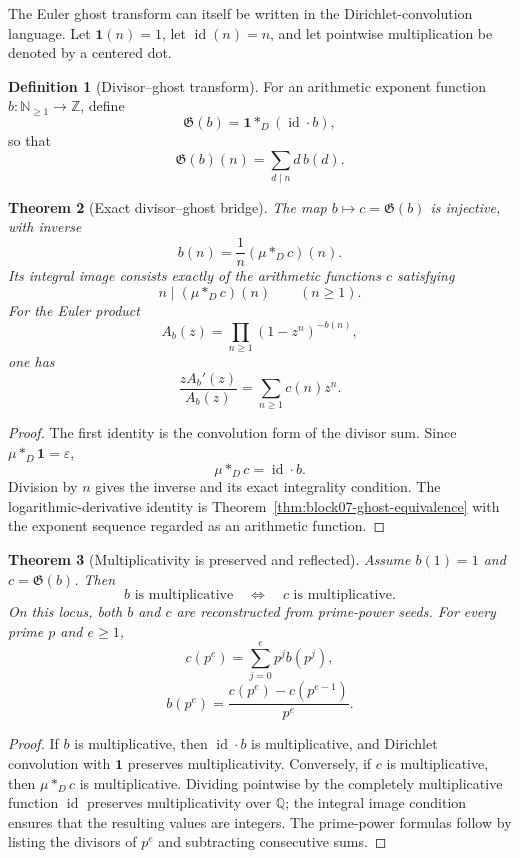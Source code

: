 \documentclass[11pt]{article}
\newtheorem{theorem}{Theorem}[section]
\theoremstyle{definition}
\newtheorem{definition}[theorem]{Definition}
\theoremstyle{remark}
\begin{document}
The Euler ghost transform can itself be written in the Dirichlet-convolution language.  Let $\mathbf{1}(n)=1$, let $\operatorname{id}(n)=n$, and let pointwise multiplication be denoted by a centered dot.

\begin{definition}[Divisor--ghost transform]
For an arithmetic exponent function $b:\mathbb N_{\geq1}\to\mathbb Z$, define
\[
\mathfrak G(b)
=
\mathbf{1}\mathbin{\ast_D}(\operatorname{id}\cdot b),
\]
so that
\[
\mathfrak G(b)(n)
=
\sum_{d\mid n}d\,b(d).
\]
\end{definition}

\begin{theorem}[Exact divisor--ghost bridge]
\label{thm:block07-divisor-ghost}
The map $b\mapsto c=\mathfrak G(b)$ is injective, with inverse
\[
\boxed{
b(n)
=
\frac1n
(\mu\mathbin{\ast_D}c)(n).
}
\]
Its integral image consists exactly of the arithmetic functions $c$ satisfying
\[
n\mid(\mu\mathbin{\ast_D}c)(n)
\qquad(n\geq1).
\]
For the Euler product
\[
A_b(z)=\prod_{n\geq1}(1-z^n)^{-b(n)},
\]
one has
\[
\frac{zA_b'(z)}{A_b(z)}
=
\sum_{n\geq1}c(n)z^n.
\]
\end{theorem}

\begin{proof}
The first identity is the convolution form of the divisor sum.  Since $\mu\mathbin{\ast_D}\mathbf{1}=\varepsilon$,
\[
\mu\mathbin{\ast_D}c
=
\operatorname{id}\cdot b.
\]
Division by $n$ gives the inverse and its exact integrality condition.  The logarithmic-derivative identity is Theorem~\ref{thm:block07-ghost-equivalence} with the exponent sequence regarded as an arithmetic function.
\end{proof}

\begin{theorem}[Multiplicativity is preserved and reflected]
\label{thm:block07-multiplicative-ghost}
Assume $b(1)=1$ and $c=\mathfrak G(b)$.  Then
\[
\boxed{
b\text{ is multiplicative}
\quad\Longleftrightarrow\quad
c\text{ is multiplicative}.}
\]
On this locus, both $b$ and $c$ are reconstructed from prime-power seeds.  For every prime $p$ and $e\geq1$,
\[
\boxed{
c(p^e)=\sum_{j=0}^{e}p^j b(p^j),}
\]
\[
\boxed{
b(p^e)=\frac{c(p^e)-c(p^{e-1})}{p^e}.}
\]
\end{theorem}

\begin{proof}
If $b$ is multiplicative, then $\operatorname{id}\cdot b$ is multiplicative, and Dirichlet convolution with $\mathbf{1}$ preserves multiplicativity.  Conversely, if $c$ is multiplicative, then $\mu\mathbin{\ast_D}c$ is multiplicative.  Dividing pointwise by the completely multiplicative function $\operatorname{id}$ preserves multiplicativity over $\mathbb Q$; the integral image condition ensures that the resulting values are integers.  The prime-power formulas follow by listing the divisors of $p^e$ and subtracting consecutive sums.
\end{proof}
\end{document}
